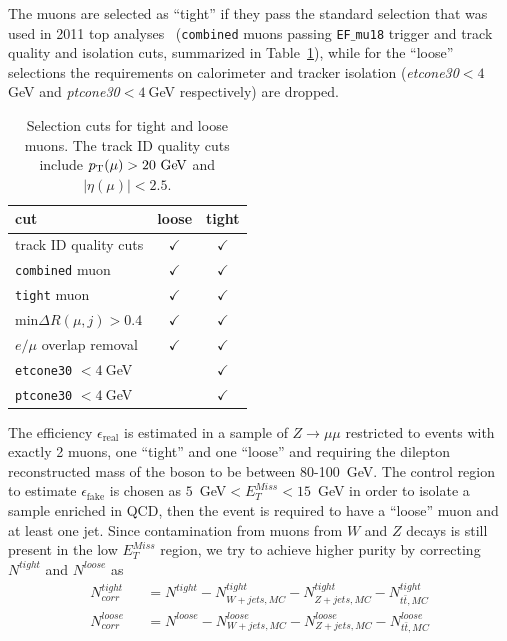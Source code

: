 The muons are selected as ``tight'' if they pass the standard selection 
that was used in 2011 top analyses~\cite{topCommonObjects2012} 
(\texttt{combined} muons
passing {\tt EF$\_$mu18} trigger and track quality and isolation cuts,
summarized in Table~\ref{tab:tightloosemu}), while for the ``loose'' 
selections the requirements on calorimeter and tracker isolation
(\textit{etcone30}$<4~$GeV and \textit{ptcone30}$<4~$GeV respectively) 
are dropped.

\begin{table}[htb]\centering
\begin{tabular}{lcc}
cut & loose & tight \\\midrule
track ID quality cuts & $\checkmark$ & $\checkmark$\\
\texttt{combined} muon & $\checkmark$ & $\checkmark$\\
\texttt{tight} muon & $\checkmark$ & $\checkmark$\\
min$\Delta R(\mu,j)>0.4$ & $\checkmark$ & $\checkmark$\\
$e/\mu$ overlap removal& $\checkmark$ & $\checkmark$\\
\texttt{etcone30} $<4~$GeV &  & $\checkmark$\\
\texttt{ptcone30} $<4~$GeV &  & $\checkmark$\\\bottomrule
\end{tabular}
\caption{Selection cuts for tight and loose muons. The track ID quality cuts include
 $\pt(\mu) > 20 \GeV$ and $|\eta(\mu)| < 2.5$.}\label{tab:tightloosemu}
\end{table}

The efficiency $\epsilon_\mathrm{real}$ is estimated in a sample of $Z\rightarrow \mu\mu$ 
restricted to events with exactly 2 muons, one ``tight'' and one ``loose'' 
and requiring the dilepton reconstructed mass of the boson to be between 80-100~GeV. 
The control region to estimate $\epsilon_\mathrm{fake}$ is chosen as 
$5$~GeV$< E^{Miss}_T<15$~GeV in order to isolate a sample enriched 
in QCD, then the event is required to have a ``loose'' muon and at 
least one jet. Since contamination from muons from $W$ and $Z$ decays 
is still present in the low $E^{Miss}_T$ region, we try to achieve 
higher purity by correcting $N^{tight}$ and $N^{loose}$ as 
\begin{eqnarray}
N^{tight}_{corr} &&=  N^{tight} - N^{tight}_{W+jets,MC} - N^{tight}_{Z+jets,MC} - N^{tight}_{t\bar{t},MC}\\
N^{loose}_{corr} &&=  N^{loose} - N^{loose}_{W+jets,MC} - N^{loose}_{Z+jets,MC} - N^{loose}_{t\bar{t},MC}
\end{eqnarray}

